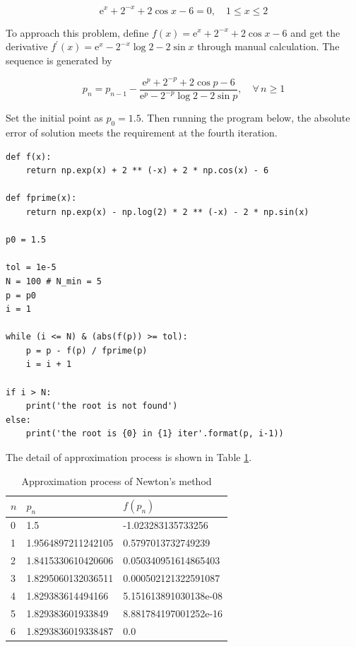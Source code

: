 \documentclass[preprint,12pt]{elsarticle}
\begin{document}
\begin{equation}
\label{eq:newton1}
    \mathrm{e}^x + 2^{-x} + 2\cos x - 6 = 0, \quad1\leq x\leq 2
\end{equation}

To approach this problem, define $f(x)=\mathrm{e}^x + 2^{-x} + 2\cos x - 6$ and get the derivative $f^{'}(x)=\mathrm{e}^x-2^{-x}\log{2}-2\sin x $ through manual calculation. The sequence is generated by 

\begin{equation}
    p_n=p_{n-1} - \frac{\mathrm{e}^p + 2^{-p} + 2\cos{p} - 6}{\mathrm{e}^p-2^{-p}\log{2}-2\sin{p}},\quad \forall\,n\geq 1
\end{equation}

Set the initial point as $p_0=1.5$. Then running the program below, the absolute error of solution meets the requirement at the fourth iteration. 

\begin{lstlisting}
def f(x):
    return np.exp(x) + 2 ** (-x) + 2 * np.cos(x) - 6

def fprime(x):
    return np.exp(x) - np.log(2) * 2 ** (-x) - 2 * np.sin(x)

p0 = 1.5

tol = 1e-5
N = 100 # N_min = 5
p = p0
i = 1

while (i <= N) & (abs(f(p)) >= tol):
    p = p - f(p) / fprime(p)
    i = i + 1

if i > N:
    print('the root is not found')
else:
    print('the root is {0} in {1} iter'.format(p, i-1))
\end{lstlisting}

The detail of approximation process is shown in Table \ref{tab:newton}.

\begin{table}[h]
\centering
\begin{tabular}{l l l}
\hline
\textbf{$n$} & \textbf{$p_n$} & \textbf{$f(p_n)$}\\
\hline
0 & 1.5 & -1.023283135733256 \\
1 & 1.9564897211242105 & 0.5797013732749239 \\
2 & 1.8415330610420606 & 0.050340951614865403 \\
3 & 1.8295060132036511 & 0.000502121322591087 \\
4 & 1.829383614494166 & 5.151613891030138e-08 \\
5 & 1.829383601933849 & 8.881784197001252e-16 \\
6 & 1.8293836019338487 & 0.0 \\
\hline
\end{tabular}
\caption{Approximation process of Newton's method}
\label{tab:newton}
\end{table}
\end{document}
